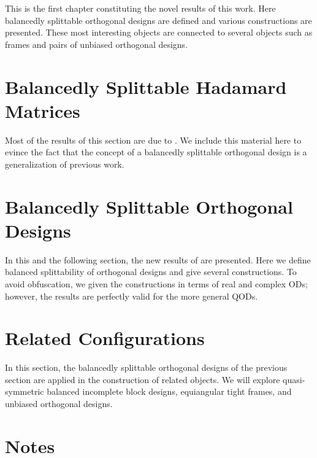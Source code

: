 \documentclass[../../main]{subfiles}
\begin{document}
This is the first chapter constituting the novel results of this work. Here balancedly splittable orthogonal designs are defined and various constructions are presented. These most interesting objects are connected to several objects such as frames and pairs of unbiased orthogonal designs.

 \section{\centering Balancedly Splittable Hadamard Matrices}
 Most of the results of this section are due to \cite{splittable-hadamard}. We include this material here to evince the fact that the concept of a balancedly splittable orthogonal design is a generalization of previous work.
 
 \dinkus
 
 
 
 \section{\centering Balancedly Splittable Orthogonal Designs}
 In this and the following section, the new results of \cite{split-od} are presented. Here we define balanced splittability of orthogonal designs and give several constructions. To avoid obfuscation, we given the constructions in terms of real and complex ODs; however, the results are perfectly valid for the more general QODs.
 
 \dinkus
 
 
 
 \section{\centering Related Configurations}
 In this section, the balancedly splittable orthogonal designs of the previous section are applied in the construction of related objects. We will explore quasi-symmetric balanced incomplete block designs, equiangular tight frames, and unbiased orthogonal designs.
 
 \dinkus
 
 
 
 \singlespace
 
 \section*{\centering Notes}
 \thednotes
 
 \doublespacing
 
 \biblio
\end{document}
